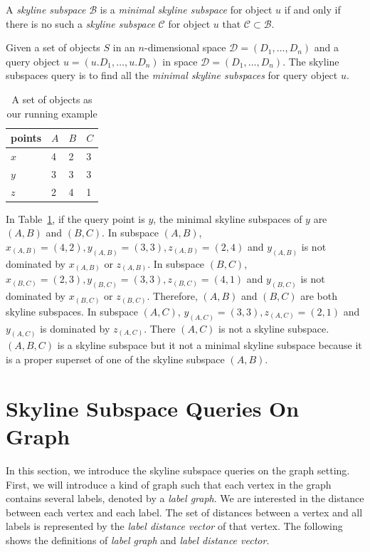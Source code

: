 \begin{definition}
A \emph{skyline subspace} $\mathcal{B}$ is a \emph{minimal skyline subspace} for object $u$ if and only if there is no such a \emph{skyline subspace} $\mathcal{C}$ for object $u$ that $\mathcal{C} \subset \mathcal{B}$.
\end{definition}

\begin{definition}
Given a set of objects $S$ in an $n$-dimensional space $\mathcal{D} = (D_1,\dots,D_n)$ and a query object $u = (u.D_1,\dots,u.D_n)$ in space $\mathcal{D} = (D_1,\dots,D_n)$. The skyline subspaces query is to find all the \emph{minimal skyline subspaces} for query object $u$.
\end{definition}

\begin{table}[h]
    \centering
    \begin{tabular}{|l|l|l|l|}
    \hline
    points & $A$ & $B$ & $C$ \\ \hline
    $x$      & 4 & 2 & 3 \\ \hline
    $y$      & 3 & 3 & 3 \\ \hline
    $z$      & 2 & 4 & 1 \\ \hline
    \end{tabular}
    \caption{\label{tab:objects_example} A set of objects as our running example}
\end{table}

In Table~\ref{tab:objects_example}, if the query point is $y$, the minimal skyline subspaces of $y$ are $(A, B)$ and $(B, C)$. In subspace $(A, B)$, $x_{(A, B)} = (4, 2), y_{(A, B)} = (3, 3), z_{(A, B)} = (2, 4)$ and $y_{(A, B)}$ is not dominated by $x_{(A, B)}$ or $z_{(A, B)}$. 
In subspace $(B, C)$, $x_{(B, C)} = (2, 3), y_{(B, C)} = (3, 3), z_{(B, C)} = (4, 1)$ and $y_{(B, C)}$ is not dominated by $x_{(B, C)}$ or $z_{(B, C)}$. Therefore, $(A, B)$ and $(B, C)$ are both skyline subspaces. 
In subspace $(A, C)$, $y_{(A, C)} = (3, 3), z_{(A, C)} = (2, 1)$ and $y_{(A, C)}$ is dominated by $z_{(A, C)}$. There $(A, C)$ is not a skyline subspace. 
$(A, B, C)$ is a skyline subspace but it not a minimal skyline subspace because it is a proper superset of one of the skyline subspace $(A, B)$.

\section{Skyline Subspace Queries On Graph}
In this section, we introduce the skyline subspace queries on the graph setting. First, we will introduce a kind of graph such that each vertex in the graph contains several labels, denoted by a \emph{label graph}. We are interested in the distance between each vertex and each label. The set of distances between a vertex and all labels is represented by the \emph{label distance vector} of that vertex. The following shows the definitions of \emph{label graph} and \emph{label distance vector}.

